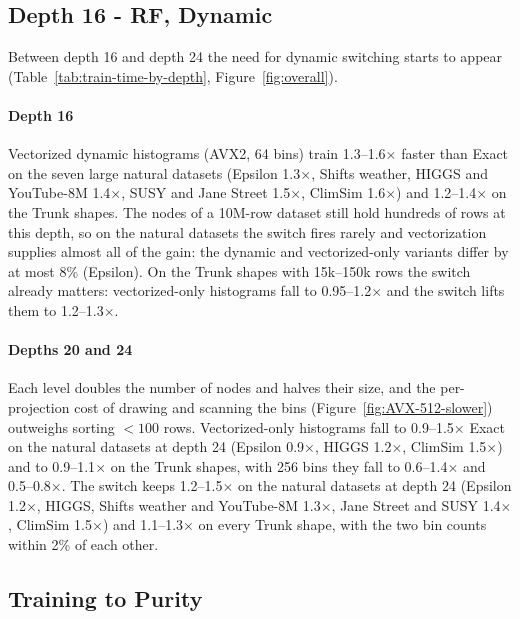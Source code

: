 \documentclass[sigconf,anonymous,review]{acmart}
\begin{document}
\subsection{Depth 16 - RF, Dynamic}
\label{sec:res-depth16}

Between depth 16 and depth 24 the need for dynamic switching starts to appear (Table~\ref{tab:train-time-by-depth}, Figure~\ref{fig:overall}).

\paragraph{Depth 16} Vectorized dynamic histograms (AVX2, 64 bins) train 1.3--1.6$\times$ faster than Exact on the seven large natural datasets (Epsilon 1.3$\times$, Shifts weather, HIGGS and YouTube-8M 1.4$\times$, SUSY and Jane Street 1.5$\times$, ClimSim 1.6$\times$) and 1.2--1.4$\times$ on the Trunk shapes. The nodes of a 10M-row dataset still hold hundreds of rows at this depth, so on the natural datasets the switch fires rarely and vectorization supplies almost all of the gain: the dynamic and vectorized-only variants differ by at most 8\% (Epsilon). On the Trunk shapes with 15k--150k rows the switch already matters: vectorized-only histograms fall to 0.95--1.2$\times$ and the switch lifts them to 1.2--1.3$\times$.

\paragraph{Depths 20 and 24} Each level doubles the number of nodes and halves their size, and the per-projection cost of drawing and scanning the bins (Figure~\ref{fig:AVX-512-slower}) outweighs sorting $<100$ rows. Vectorized-only histograms fall to 0.9--1.5$\times$ Exact on the natural datasets at depth 24 (Epsilon 0.9$\times$, HIGGS 1.2$\times$, ClimSim 1.5$\times$) and to 0.9--1.1$\times$ on the Trunk shapes, with 256 bins they fall to 0.6--1.4$\times$ and 0.5--0.8$\times$. The switch keeps 1.2--1.5$\times$ on the natural datasets at depth 24 (Epsilon 1.2$\times$, HIGGS, Shifts weather and YouTube-8M 1.3$\times$, Jane Street and SUSY 1.4$\times$, ClimSim 1.5$\times$) and 1.1--1.3$\times$ on every Trunk shape, with the two bin counts within 2\% of each other.

\subsection{Training to Purity}
\label{sec:res-purity}
\end{document}
